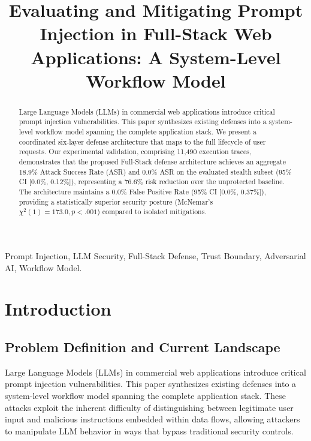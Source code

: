 \documentclass[conference]{IEEEtran}
\begin{document}
\title{Evaluating and Mitigating Prompt Injection in Full-Stack Web Applications: A System-Level Workflow Model}

\author{
}

\maketitle

\begin{abstract}
Large Language Models (LLMs) in commercial web applications introduce critical prompt injection vulnerabilities. This paper synthesizes existing defenses into a system-level workflow model spanning the complete application stack. We present a coordinated six-layer defense architecture that maps to the full lifecycle of user requests. Our experimental validation, comprising 11,490 execution traces, demonstrates that the proposed Full-Stack defense architecture achieves an aggregate 18.9\% Attack Success Rate (ASR) and 0.0\% ASR on the evaluated stealth subset (95\% CI [0.0\%, 0.12\%]), representing a 76.6\% risk reduction over the unprotected baseline. The architecture maintains a 0.0\% False Positive Rate (95\% CI [0.0\%, 0.37\%]), providing a statistically superior security posture (McNemar's $\chi^2(1) = 173.0, p < .001$) compared to isolated mitigations.
\end{abstract}

\begin{IEEEkeywords}
Prompt Injection, LLM Security, Full-Stack Defense, Trust Boundary, Adversarial AI, Workflow Model.
\end{IEEEkeywords}

\section{Introduction}

\subsection{Problem Definition and Current Landscape}
Large Language Models (LLMs) in commercial web applications introduce critical prompt injection vulnerabilities. This paper synthesizes existing defenses into a system-level workflow model spanning the complete application stack. These attacks exploit the inherent difficulty of distinguishing between legitimate user input and malicious instructions embedded within data flows, allowing attackers to manipulate LLM behavior in ways that bypass traditional security controls.
\end{document}
